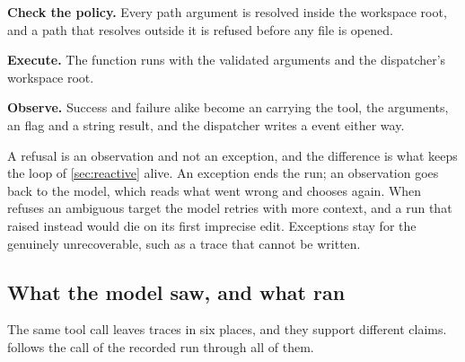 \item \textbf{Check the policy.} Every path argument is resolved inside the workspace root, and a
path that resolves outside it is refused before any file is opened.

\item \textbf{Execute.} The function runs with the validated arguments and the dispatcher's
workspace root.

\item \textbf{Observe.} Success and failure alike become an  carrying the tool,
the arguments, an  flag and a string result, and the dispatcher writes a
 event either way.

\ei

A refusal is an observation and not an exception, and the difference is what keeps the loop of
\cref{sec:reactive} alive. An exception ends the run; an observation goes back to the model, which
reads what went wrong and chooses again. When  refuses an ambiguous target the model
retries with more context, and a run that raised instead would die on its first imprecise edit.
Exceptions stay for the genuinely unrecoverable, such as a trace that cannot be written.

\subsection{What the model saw, and what ran}
\label{sec:boundary-artifacts}

The same tool call leaves traces in six places, and they support different claims.
 follows the  call of the recorded run through all
of them.

